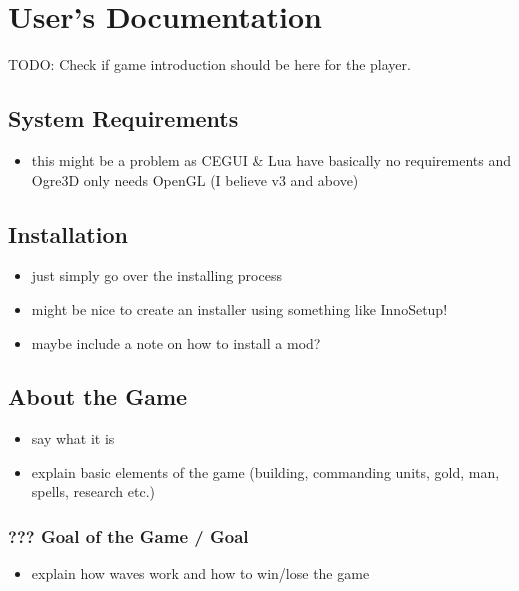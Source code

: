 \chapter{User's Documentation}

TODO: Check if game introduction should be here for the player.

\section{System Requirements}

\begin{itemize}
	\item this might be a problem as CEGUI \& Lua have basically no
		requirements and Ogre3D only needs OpenGL (I believe v3 and above)
\end{itemize}

\section{Installation}

\begin{itemize}
    \item just simply go over the installing process
    \item might be nice to create an installer using something like InnoSetup!
    \item maybe include a note on how to install a mod?
\end{itemize}

\section{About the Game}

\begin{itemize}
	\item say what it is
	\item explain basic elements of the game (building, commanding units, gold,
		man, spells, research etc.)
\end{itemize}

\subsection{??? Goal of the Game / Goal}

\begin{itemize}
    \item explain how waves work and how to win/lose the game
\end{itemize}

